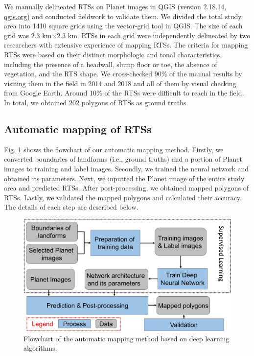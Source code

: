 \documentclass[authoryear,preprint,review,12pt]{elsarticle}
\begin{document}
We manually delineated RTSs  on Planet images in QGIS (version 2.18.14, \url{qgis.org}) and conducted fieldwork to validate them. We divided the total study area into 1410 square grids using the vector-grid tool in QGIS. The size of each grid was 2.3 km$\times$2.3 km. RTSs in each grid were independently delineated by two researchers with extensive experience of mapping RTSs. 
The criteria for mapping RTSs were based on their distinct morphologic and tonal characteristics, including the presence of a headwall, slump floor or toe, the absence of vegetation, and the RTS shape. We cross-checked 90\% of the manual results by visiting them in the field in 2014 and 2018 and all of them by visual checking from Google Earth. Around 10\% of the RTSs were difficult to reach in the field. In total, we obtained 202 polygons of RTSs as ground truths.  

\subsection{Automatic mapping of RTSs}
\label{subsec_auto_mapping}

Fig. \ref{fig_flowchart} shows the flowchart of our automatic mapping method. Firstly, we converted boundaries of landforms (i.e., ground truths) and a portion of Planet images to training and label images. Secondly, we trained the neural network and obtained its parameters. Next, we inputted the Planet image of the entire study area and predicted RTSs. After post-processing, we obtained mapped polygons of RTSs. Lastly, we validated the mapped polygons and calculated their accuracy. The details of each step are described below.

\begin{figure}[ht]
	\centering
	\includegraphics[width=12cm]{figures/flowchart_trim.jpg}
	\caption{Flowchart of the automatic mapping method based on deep learning algorithms.}
	\label{fig_flowchart}
\end{figure}
\end{document}

